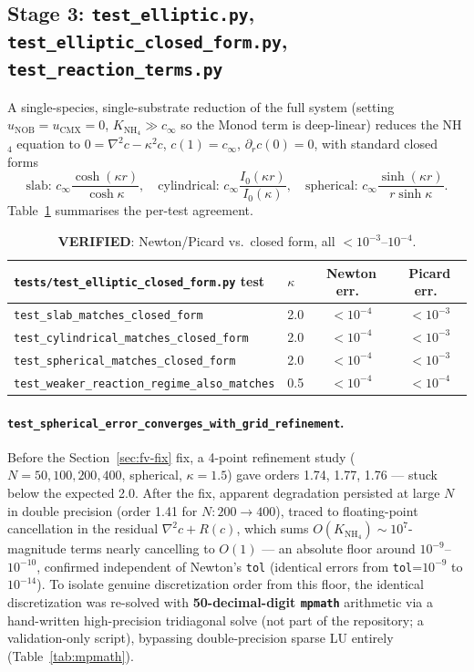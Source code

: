\documentclass[11pt]{article}
\newcommand{\verified}{\textcolor{green!45!black}{\textbf{VERIFIED}}}
\newcommand{\code}[1]{\texttt{#1}}
\newcommand{\test}[1]{\texttt{\small #1}}
\begin{document}
\subsection{Stage 3: \code{test\_elliptic.py}, \code{test\_elliptic\_closed\_form.py}, \code{test\_reaction\_terms.py}}
\label{sec:convergence}
A single-species, single-substrate reduction of the full system (setting
$u_{\mathrm{NOB}}{=}u_{\mathrm{CMX}}{=}0$, $K_{\mathrm{NH_4}}\!\gg\! c_\infty$
so the Monod term is deep-linear) reduces the NH$_4$ equation to
$0=\nabla^2 c-\kappa^2 c$, $c(1){=}c_\infty$, $\partial_r c(0){=}0$, with
standard closed forms
\[
\text{slab: } c_\infty\frac{\cosh(\kappa r)}{\cosh\kappa}, \quad
\text{cylindrical: } c_\infty\frac{I_0(\kappa r)}{I_0(\kappa)}, \quad
\text{spherical: } c_\infty\frac{\sinh(\kappa r)}{r\sinh\kappa}.
\]
Table~\ref{tab:closedform} summarises the per-test agreement.

\begin{table}[h]
\centering
\small
\begin{tabular}{llcc}
\toprule
\code{tests/test\_elliptic\_closed\_form.py} test & $\kappa$ & Newton err.\ & Picard err.\ \\
\midrule
\test{test\_slab\_matches\_closed\_form} & 2.0 & $<10^{-4}$ & $<10^{-3}$ \\
\test{test\_cylindrical\_matches\_closed\_form} & 2.0 & $<10^{-4}$ & $<10^{-3}$ \\
\test{test\_spherical\_matches\_closed\_form} & 2.0 & $<10^{-4}$ & $<10^{-3}$ \\
\test{test\_weaker\_reaction\_regime\_also\_matches} & 0.5 & $<10^{-4}$ & $<10^{-4}$ \\
\bottomrule
\end{tabular}
\caption{\verified{}: Newton/Picard vs.\ closed form, all $<10^{-3}$--$10^{-4}$.}
\label{tab:closedform}
\end{table}

\paragraph{\test{test\_spherical\_error\_converges\_with\_grid\_refinement}.}
Before the Section~\ref{sec:fv-fix} fix, a 4-point refinement study
($N{=}50,100,200,400$, spherical, $\kappa{=}1.5$) gave orders 1.74, 1.77, 1.76
--- stuck below the expected 2.0. After the fix, apparent degradation
persisted at large $N$ in double precision (order 1.41 for $N{:}200{\to}400$),
traced to floating-point cancellation in the residual $\nabla^2 c + R(c)$,
which sums $O(K_{\mathrm{NH_4}})\!\sim\!10^7$-magnitude terms nearly cancelling
to $O(1)$ --- an absolute floor around $10^{-9}$--$10^{-10}$, confirmed
independent of Newton's \code{tol} (identical errors from \code{tol}=$10^{-9}$
to $10^{-14}$). To isolate genuine discretization order from this floor, the
identical discretization was re-solved with \textbf{50-decimal-digit
\code{mpmath}} arithmetic via a hand-written high-precision tridiagonal
solve (not part of the repository; a validation-only script), bypassing
double-precision sparse LU entirely (Table~\ref{tab:mpmath}).
\end{document}
